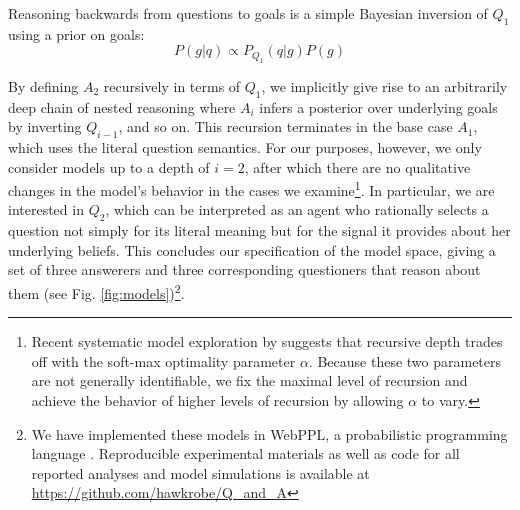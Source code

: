 \documentclass[12pt, floatsintext, jou]{apa6}
\begin{document}
%
Reasoning backwards from questions to goals is a simple Bayesian inversion of $Q_1$ using a prior on goals:
$$
P(g|q) \propto P_{Q_1}(q|g)P(g)
$$

By defining $A_2$ recursively in terms of $Q_1$, we implicitly give rise to an arbitrarily deep chain of nested reasoning where $A_{i}$ infers a posterior over underlying goals by inverting $Q_{i-1}$, and so on. This recursion terminates in the base case $A_1$, which uses the literal question semantics. For our purposes, however, we only consider models up to a depth of $i=2$, after which there are no qualitative changes in the model's behavior in the cases we examine\footnote{Recent systematic model exploration by  suggests that recursive depth trades off with the soft-max optimality parameter $\alpha$. Because these two parameters are not generally identifiable, we fix the maximal level of recursion and achieve the behavior of higher levels of recursion by allowing $\alpha$ to vary.}. In particular, we are interested in $Q_2$, which can be interpreted as an agent who rationally selects a question not simply for its literal meaning but for the signal it provides about her underlying beliefs. This concludes our specification of the model space, giving a set of three answerers and three corresponding questioners that reason about them (see Fig. \ref{fig:models})\footnote{We have implemented these models in WebPPL, a probabilistic programming language \cite{GoodmanStuhlmuller14_DIPPL}. Reproducible experimental materials as well as code for all reported analyses and model simulations is available at \url{https://github.com/hawkrobe/Q\_and\_A}}.
 

%
\end{document}
